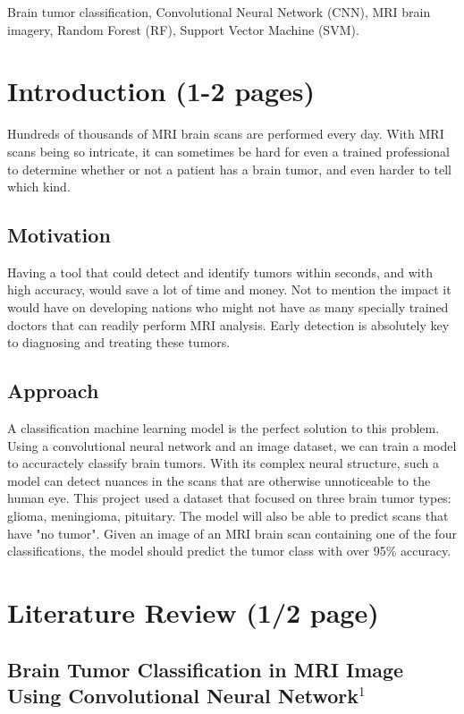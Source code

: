 \documentclass[conference]{IEEEtran}
\begin{document}
\begin{IEEEkeywords}
Brain tumor classification, Convolutional Neural Network (CNN), MRI brain imagery, Random Forest (RF), Support Vector Machine (SVM). 
\end{IEEEkeywords}

\large 
\section{\large Introduction (1-2 pages)}
Hundreds of thousands of MRI brain scans are performed every day. With MRI scans being so intricate, it can sometimes be hard for even a trained professional to determine whether or not a patient has a brain tumor, and even harder to tell which kind. 

\subsection{\large Motivation}
Having a tool that could detect and identify tumors within seconds, and with high accuracy, would save a lot of time and money. Not to mention the impact it would have on developing nations who might not have as many specially trained doctors that can readily perform MRI analysis. Early detection is absolutely key to diagnosing and treating these tumors.

\subsection{\large Approach}
A classification machine learning model is the perfect solution to this problem. Using a convolutional neural network and an image dataset, we can train a model to accuractely classify brain tumors. With its complex neural structure, such a model can detect nuances in the scans that are otherwise unnoticeable to the human eye. This project used a dataset that focused on three brain tumor types: glioma, meningioma, pituitary. The model will also be able to predict scans that have "no tumor". Given an image of an MRI brain scan containing one of the four classifications, the model should predict the tumor class with over 95\% accuracy.

\section{\large Literature Review (1/2 page)}

\subsection{\large Brain Tumor Classification in MRI Image Using Convolutional Neural Network$^{1}$}
\end{document}
